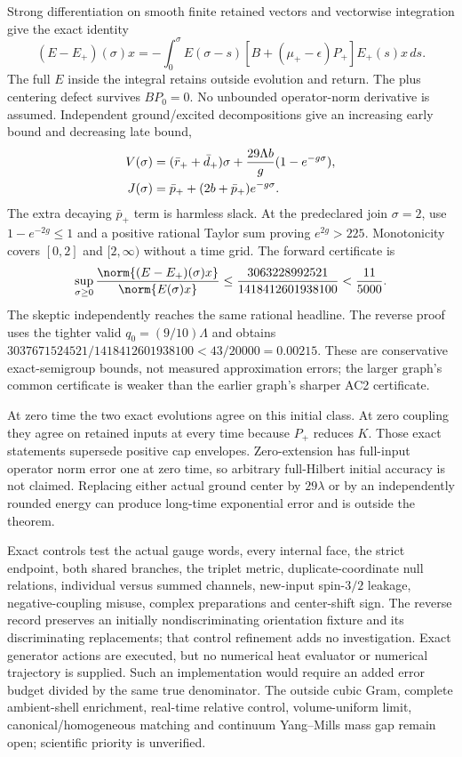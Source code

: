Strong differentiation on smooth finite retained vectors and vectorwise integration give the exact identity
\begin{equation}
 (E-E_+)(\sigma)x=-\int_0^\sigma E(\sigma-s)
 [B+(\mu_+-\epsilon)P_+]E_+(s)x\,ds.
 \label{r28:eq:ah1-duhamel}
\end{equation}
The full $E$ inside the integral retains outside evolution and return. The plus centering defect survives $BP_0=0$. No unbounded operator-norm derivative is assumed. Independent ground/excited decompositions give an increasing early bound and decreasing late bound,
\begin{align}
 V(\sigma)&=(\bar r_++\bar d_+)\sigma
       +\frac{29\Lambda b}{g}(1-e^{-g\sigma}),\notag\\
 J(\sigma)&=\bar p_++(2b+\bar p_+)e^{-g\sigma}.
 \label{r28:eq:ah1-join-bounds}
\end{align}
The extra decaying $\bar p_+$ term is harmless slack. At the predeclared join $\sigma=2$, use $1-e^{-2g}\le1$ and a positive rational Taylor sum proving $e^{2g}>225$. Monotonicity covers $[0,2]$ and $[2,\infty)$ without a time grid. The forward certificate is
\begin{equation}
 \sup_{\sigma\ge0}
 \frac{\norm{(E-E_+)(\sigma)x}}{\norm{E(\sigma)x}}
 \le\frac{3063228992521}{1418412601938100}
 <\frac{11}{5000}.
 \label{r28:eq:ah1-main-bound}
\end{equation}
The skeptic independently reaches the same rational headline. The reverse proof uses the tighter valid $q_0=(9/10)\Lambda$ and obtains
$3037671524521/1418412601938100<43/20000=0.00215$.
These are conservative exact-semigroup bounds, not measured approximation errors; the larger graph's common certificate is weaker than the earlier graph's sharper AC2 certificate.

At zero time the two exact evolutions agree on this initial class. At zero coupling they agree on retained inputs at every time because $P_+$ reduces $K$. Those exact statements supersede positive cap envelopes. Zero-extension has full-input operator norm error one at zero time, so arbitrary full-Hilbert initial accuracy is not claimed. Replacing either actual ground center by $29\lambda$ or by an independently rounded energy can produce long-time exponential error and is outside the theorem.

Exact controls test the actual gauge words, every internal face, the strict endpoint, both shared branches, the triplet metric, duplicate-coordinate null relations, individual versus summed channels, new-input spin-$3/2$ leakage, negative-coupling misuse, complex preparations and center-shift sign. The reverse record preserves an initially nondiscriminating orientation fixture and its discriminating replacements; that control refinement adds no investigation. Exact generator actions are executed, but no numerical heat evaluator or numerical trajectory is supplied. Such an implementation would require an added error budget divided by the same true denominator. The outside cubic Gram, complete ambient-shell enrichment, real-time relative control, volume-uniform limit, canonical/homogeneous matching and continuum Yang--Mills mass gap remain open; scientific priority is unverified.
